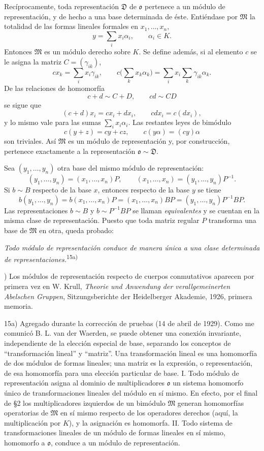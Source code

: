 \documentclass[11pt]{article}
\providecommand{\mM}{\mathfrak{M}}
\providecommand{\mo}{\mathfrak{o}}
\begin{document}
Recíprocamente, toda representación $\mathfrak D$ de $\mo$ pertenece a un módulo de representación, y de hecho a una base determinada de éste. Entiéndase por $\mM$ la totalidad de las formas lineales formales en $x_1,\ldots,x_n$,
\[
        y=\sum_i x_i\alpha_i,
        \qquad \alpha_i\in K.
\]
Entonces $\mM$ es un módulo derecho sobre $K$. Se define además, si al elemento $c$ se le asigna la matriz $C=(\gamma_{ik})$,
\[
        cx_k=\sum_i x_i\gamma_{ik},
        \qquad
        c\biggl(\sum_k x_k\alpha_k\biggr)
        =\sum_i x_i\sum_k\gamma_{ik}\alpha_k.
\]
De las relaciones de homomorfía
\[
        c+d\sim C+D,
        \qquad
        cd\sim CD
\]
se sigue que
\[
        (c+d)x_i=cx_i+dx_i,
        \qquad
        cdx_i=c(dx_i),
\]
y lo mismo vale para las sumas $\sum_i x_i\alpha_i$. Las restantes leyes de bimódulo
\[
        c(y+z)=cy+cz,
        \qquad
        c(y\alpha)=(cy)\alpha
\]
son triviales. Así $\mM$ es un módulo de representación y, por construcción, pertenece exactamente a la representación $\mo\sim\mathfrak D$.

Sea $(y_1,\ldots,y_n)$ otra base del mismo módulo de representación:
\[
        (y_1,\ldots,y_n)=(x_1,\ldots,x_n)P,
        \qquad
        (x_1,\ldots,x_n)=(y_1,\ldots,y_n)P^{-1}.
\]
Si $b\sim B$ respecto de la base $x$, entonces respecto de la base $y$ se tiene
\[
        b(y_1,\ldots,y_n)
        =b(x_1,\ldots,x_n)P
        =(x_1,\ldots,x_n)BP
        =(y_1,\ldots,y_n)P^{-1}BP.
\]
Las representaciones $b\sim B$ y $b\sim P^{-1}BP$ se llaman \emph{equivalentes} y se cuentan en la misma clase de representación. Puesto que toda matriz regular $P$ transforma una base de $\mM$ en otra, queda probado:

\emph{Todo módulo de representación conduce de manera única a una clase determinada de representaciones.}\textsuperscript{15a)}

{\footnotesize{}) Los módulos de representación respecto de cuerpos conmutativos aparecen por primera vez en W. Krull, \emph{Theorie und Anwendung der verallgemeinerten Abelschen Gruppen}, Sitzungsberichte der Heidelberger Akademie, 1926, primera memoria.\par
15a) Agregado durante la corrección de pruebas (14 de abril de 1929). Como me comunicó B. L. van der Waerden, se puede obtener una conexión invariante, independiente de la elección especial de base, separando los conceptos de ``transformación lineal'' y ``matriz''. Una transformación lineal es una homomorfía de dos módulos de formas lineales; una matriz es la expresión, o representación, de esa homomorfía para una elección particular de base. I. Todo módulo de representación asigna al dominio de multiplicadores $\mo$ un sistema homomorfo único de transformaciones lineales del módulo en sí mismo. En efecto, por el final de §2 los multiplicadores izquierdos de un bimódulo $\mM$ generan homomorfías operatorias de $\mM$ en sí mismo respecto de los operadores derechos (aquí, la multiplicación por $K$), y la asignación es homomorfa. II. Todo sistema de transformaciones lineales de un módulo de formas lineales en sí mismo, homomorfo a $\mo$, conduce a un módulo de representación.\par}
\end{document}
